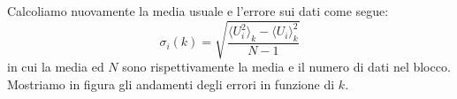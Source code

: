 \documentclass[a4paper,10pt]{article}
\begin{document}
Calcoliamo nuovamente la media usuale e l'errore sui dati come segue:
\begin{equation}
	\sigma_i(k)=\sqrt{\frac{\langle U_i^2 \rangle_k - \langle U_i \rangle_k ^2}{N-1}}
\end{equation}
in cui la media ed $N$ sono rispettivamente la media e il numero di dati nel blocco. 
Mostriamo in figura gli andamenti degli errori in funzione di $k$.
\medskip
\begin{figure}[H]
	\centering 
	\qquad\qquad
	\qquad\qquad
	\qquad\qquad
	\qquad\qquad
\end{figure}
\end{document}
